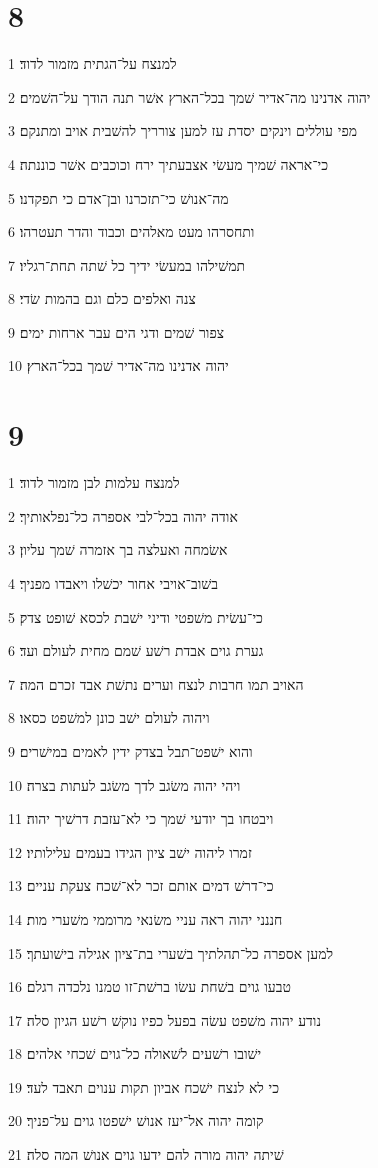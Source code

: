 \chapter{8}

\par 1 למנצח על־הגתית מזמור לדוד׃
\par 2 יהוה אדנינו מה־אדיר שׁמך בכל־הארץ אשׁר תנה הודך על־השׁמים׃
\par 3 מפי עוללים וינקים יסדת עז למען צורריך להשׁבית אויב ומתנקם׃
\par 4 כי־אראה שׁמיך מעשׂי אצבעתיך ירח וכוכבים אשׁר כוננתה׃
\par 5 מה־אנושׁ כי־תזכרנו ובן־אדם כי תפקדנו׃
\par 6 ותחסרהו מעט מאלהים וכבוד והדר תעטרהו׃
\par 7 תמשׁילהו במעשׂי ידיך כל שׁתה תחת־רגליו׃
\par 8 צנה ואלפים כלם וגם בהמות שׂדי׃
\par 9 צפור שׁמים ודגי הים עבר ארחות ימים׃
\par 10 יהוה אדנינו מה־אדיר שׁמך בכל־הארץ׃

\chapter{9}

\par 1 למנצח עלמות לבן מזמור לדוד׃
\par 2 אודה יהוה בכל־לבי אספרה כל־נפלאותיך׃
\par 3 אשׂמחה ואעלצה בך אזמרה שׁמך עליון׃
\par 4 בשׁוב־אויבי אחור יכשׁלו ויאבדו מפניך׃
\par 5 כי־עשׂית משׁפטי ודיני ישׁבת לכסא שׁופט צדק׃
\par 6 גערת גוים אבדת רשׁע שׁמם מחית לעולם ועד׃
\par 7 האויב תמו חרבות לנצח וערים נתשׁת אבד זכרם המה׃
\par 8 ויהוה לעולם ישׁב כונן למשׁפט כסאו׃
\par 9 והוא ישׁפט־תבל בצדק ידין לאמים במישׁרים׃
\par 10 ויהי יהוה משׂגב לדך משׂגב לעתות בצרה׃
\par 11 ויבטחו בך יודעי שׁמך כי לא־עזבת דרשׁיך יהוה׃
\par 12 זמרו ליהוה ישׁב ציון הגידו בעמים עלילותיו׃
\par 13 כי־דרשׁ דמים אותם זכר לא־שׁכח צעקת עניים׃
\par 14 חננני יהוה ראה עניי משׂנאי מרוממי משׁערי מות׃
\par 15 למען אספרה כל־תהלתיך בשׁערי בת־ציון אגילה בישׁועתך׃
\par 16 טבעו גוים בשׁחת עשׂו ברשׁת־זו טמנו נלכדה רגלם׃
\par 17 נודע יהוה משׁפט עשׂה בפעל כפיו נוקשׁ רשׁע הגיון סלה׃
\par 18 ישׁובו רשׁעים לשׁאולה כל־גוים שׁכחי אלהים׃
\par 19 כי לא לנצח ישׁכח אביון תקות ענוים תאבד לעד׃
\par 20 קומה יהוה אל־יעז אנושׁ ישׁפטו גוים על־פניך׃
\par 21 שׁיתה יהוה מורה להם ידעו גוים אנושׁ המה סלה׃

